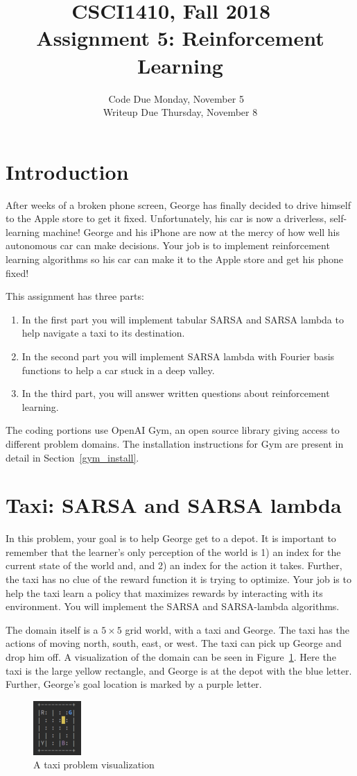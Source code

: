 \documentclass[12pt]{article}
\title{CSCI1410, Fall 2018 ~\\
Assignment 5: Reinforcement Learning}
\date{Code Due Monday, November 5 ~\\
Writeup Due Thursday, November 8}
\author{ }
\begin{document}
\maketitle


\section{Introduction}
After weeks of a broken phone screen, George has finally decided to drive himself to the Apple store to get it fixed. Unfortunately, his car is now a driverless, self-learning machine! George and his iPhone are now at the mercy of how well his autonomous car can make decisions. Your job is to implement reinforcement learning algorithms so his car can make it to the Apple store and get his phone fixed!

This assignment has three parts:
\begin{enumerate}
    \item In the first part you will implement tabular SARSA and SARSA lambda to help navigate a taxi to its destination. 
    \item In the second part you will implement SARSA lambda with Fourier basis functions to help a car stuck in a deep valley.
    \item In the third part, you will answer written questions about reinforcement learning.
\end{enumerate}
The coding portions use OpenAI Gym, an open source library giving access to different problem domains. The installation instructions for Gym are present in detail in Section~\ref{gym_install}.

\section{Taxi: SARSA and SARSA lambda}
\par {In this problem, your goal is to help George get to a depot. It is important to remember that the learner's only perception of the world is 1) an index for the current state of the world and, and 2) an index for the action it takes. Further, the taxi has no clue of the reward function it is trying to optimize. Your job is to help the taxi learn a policy that maximizes rewards by interacting with its environment. You will implement the SARSA and SARSA-lambda algorithms.
}

The domain itself is a $5 \times 5$ grid world, with a taxi and George. The taxi has the actions of moving north, south, east, or west. The taxi can pick up George and drop him off. 
A visualization of the domain can be seen in Figure~\ref{fig:taxi}. Here the taxi is the large yellow rectangle, and George is at the depot with the blue letter. Further, George's goal location is marked by a purple letter.
\begin{figure}
    \centering
    \includegraphics{taxi.png}
    \caption{A taxi problem visualization}
    \label{fig:taxi}
\end{figure}
\end{document}

